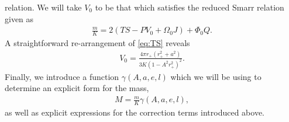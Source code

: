 \documentclass[
twoside,
openright,
frontopenright,
]{dmathesis}
\begin{document}
relation. We will take $V_0$ to be that which satisfies the reduced Smarr
relation given as
\begin{align}\label{eq:Smarr0}
\frac{m}{K} = 2(TS-PV_0+\Omega_0 J)+\Phi_0 Q.
\end{align}
A straightforward re-arrangement of \cref{eq:TS} reveals
\begin{align}\label{eq:V0}
V_0 = \frac{4\pi r_+ (r_+^2+a^2)}{3 K (1-A^2 r_+^2)^2}.
\end{align}
Finally, we introduce a function $\gamma(A,a,e,l)$ which we will be using to
determine an explicit form for the mass,
\begin{align}\label{eq:defM}
M=\frac{m}{K} \gamma(A,a,e,l),
\end{align}
as well as explicit expressions for the correction terms introduced above.
\end{document}
